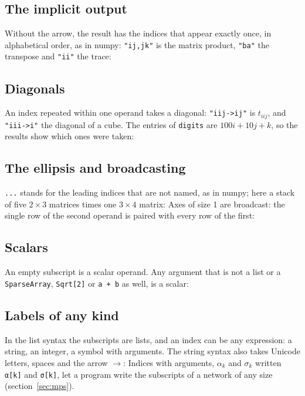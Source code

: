 \documentclass[11pt,a4paper]{article}
\begin{document}
\subsection{The implicit output}
Without the arrow, the result has the indices that appear exactly once, in alphabetical order, as in numpy:
\texttt{"ij,jk"} is the matrix product, \texttt{"ba"} the transpose and \texttt{"ii"} the trace:

\subsection{Diagonals}
An index repeated within one operand takes a diagonal: \texttt{"iij->ij"} is $t_{iij}$, and \texttt{"iii->i"} the
diagonal of a cube. The entries of \texttt{digits} are $100i+10j+k$, so the results show which ones were taken:

\subsection{The ellipsis and broadcasting}
\texttt{...} stands for the leading indices that are not named, as in numpy; here a stack of five $2\times3$ matrices
times one $3\times4$ matrix:
Axes of size 1 are broadcast: the single row of the second operand is paired with every row of the first:

\subsection{Scalars}
An empty subscript is a scalar operand. Any argument that is not a list or a \texttt{SparseArray}, \texttt{Sqrt[2]} or
\texttt{a + b} as well, is a scalar:

\subsection{Labels of any kind}
In the list syntax the subscripts are lists, and an index can be any expression: a string, an integer, a symbol with
arguments. The string syntax also takes Unicode letters, spaces and the arrow $\to$:
Indices with arguments, $\alpha_k$ and $\sigma_k$ written \texttt{α[k]} and \texttt{σ[k]}, let a program write the
subscripts of a network of any size (section~\ref{sec:mps}).

\end{document}
